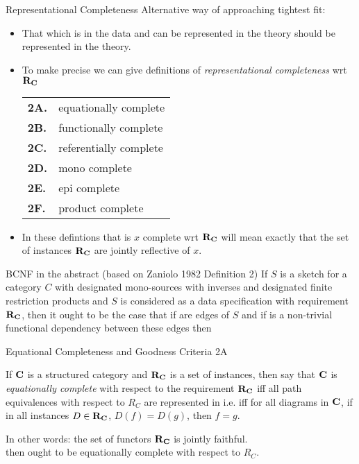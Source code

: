 \begin{frame}{Representational Completeness}
Alternative way of approaching tightest fit:
\begin{itemize}
\item That which is in the data and can be represented in the theory should be represented in the theory.
\item To make precise we can give definitions
 of \textit{representational completeness} wrt $\textbf{R}_{\textbf{C}}$ 
\begin{center}
\begin{tabular}{>{\bfseries}l l} 
2A. & equationally complete   \\
2B. & functionally complete   \\
2C. & referentially complete  \\
2D. & mono complete           \\
2E. & epi complete            \\
2F. & product complete        \\
\end{tabular}
\end{center}
\pause \item In these defintions that \catcw is $x$ complete wrt $\textbf{R}_{\textbf{C}}$ will mean exactly that the set of instances $\textbf{R}_{\textbf{C}}$ are jointly reflective of $x$.
\end{itemize}
\end{frame}


\begin{frame}{BCNF in the abstract (based on Zaniolo 1982 Definition 2)}
If $S$ is a sketch for a \rangeplus category $C$ with designated mono-sources with inverses   and designated finite restriction products
and $S$ is considered as a data specification with requirement $\textbf{R}_{\textbf{C}}$, then it ought to be the case
that if 
are edges of $S$
and if   is a non-trivial functional dependency  between these edges
then 
\end{frame}



\begin{frame}{Equational Completeness and Goodness Criteria 2A}
\pause \begin{definition}
If $\textbf{C}$ is a  structured category and $\textbf{R}_{\textbf{C}}$ is a set of instances,
 then say that  $\textbf{C}$ is \textit{equationally complete} with respect 
to the requirement $\textbf{R}_{\textbf{C}}$ iff all path equivalences with respect to $R_C$ are represented in \catcw 
i.e. iff for all diagrams \fgparalleldiagram in $\textbf{C}$,  
if in all instances $D \in \textbf{R}_{\textbf{C}}$, $D(f)=D(g)$,  then $f=g$.
\end{definition}
\medskip
\pause In other words:
the set of functors $\textbf{R}_{\textbf{C}}$ is jointly faithful. \\
\medskip
\pause {} \IfSforCwithRCwords then \catcw ought to be equationally complete
with respect to $R_C$.
\end{frame}

